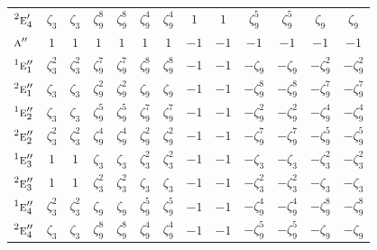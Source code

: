 \documentclass[10pt,a4paper]{article}
\numberwithin{equation}{section}
\newcommand{\irr}[1]{\text{\normalfont\scshape #1}}
\newcommand{\conjpair}[1]{{}^{#1}}
\newcommand{\rootunity}[1]{\zeta_{#1}}
\begin{document}
{\begin{longtable}{@{}lcccccccccccc@{}}
$\conjpair{2}\irr{e}_{4}'$ & $\rootunity{3}$ & $\rootunity{3}$ & $\rootunity{9}^{8}$ & $\rootunity{9}^{8}$ & $\rootunity{9}^{4}$ & $\rootunity{9}^{4}$ & $1$ & $1$ & $\rootunity{9}^{5}$ & $\rootunity{9}^{5}$ & $\rootunity{9}$ & $\rootunity{9}$\\
$\irr{a}''$ & $1$ & $1$ & $1$ & $1$ & $1$ & $1$ & $-1$ & $-1$ & $-1$ & $-1$ & $-1$ & $-1$\\
$\conjpair{1}\irr{e}_{1}''$ & $\rootunity{3}^{2}$ & $\rootunity{3}^{2}$ & $\rootunity{9}^{7}$ & $\rootunity{9}^{7}$ & $\rootunity{9}^{8}$ & $\rootunity{9}^{8}$ & $-1$ & $-1$ & $-\rootunity{9}$ & $-\rootunity{9}$ & $-\rootunity{9}^{2}$ & $-\rootunity{9}^{2}$\\
$\conjpair{2}\irr{e}_{1}''$ & $\rootunity{3}$ & $\rootunity{3}$ & $\rootunity{9}^{2}$ & $\rootunity{9}^{2}$ & $\rootunity{9}$ & $\rootunity{9}$ & $-1$ & $-1$ & $-\rootunity{9}^{8}$ & $-\rootunity{9}^{8}$ & $-\rootunity{9}^{7}$ & $-\rootunity{9}^{7}$\\
$\conjpair{1}\irr{e}_{2}''$ & $\rootunity{3}$ & $\rootunity{3}$ & $\rootunity{9}^{5}$ & $\rootunity{9}^{5}$ & $\rootunity{9}^{7}$ & $\rootunity{9}^{7}$ & $-1$ & $-1$ & $-\rootunity{9}^{2}$ & $-\rootunity{9}^{2}$ & $-\rootunity{9}^{4}$ & $-\rootunity{9}^{4}$\\
$\conjpair{2}\irr{e}_{2}''$ & $\rootunity{3}^{2}$ & $\rootunity{3}^{2}$ & $\rootunity{9}^{4}$ & $\rootunity{9}^{4}$ & $\rootunity{9}^{2}$ & $\rootunity{9}^{2}$ & $-1$ & $-1$ & $-\rootunity{9}^{7}$ & $-\rootunity{9}^{7}$ & $-\rootunity{9}^{5}$ & $-\rootunity{9}^{5}$\\
$\conjpair{1}\irr{e}_{3}''$ & $1$ & $1$ & $\rootunity{3}$ & $\rootunity{3}$ & $\rootunity{3}^{2}$ & $\rootunity{3}^{2}$ & $-1$ & $-1$ & $-\rootunity{3}$ & $-\rootunity{3}$ & $-\rootunity{3}^{2}$ & $-\rootunity{3}^{2}$\\
$\conjpair{2}\irr{e}_{3}''$ & $1$ & $1$ & $\rootunity{3}^{2}$ & $\rootunity{3}^{2}$ & $\rootunity{3}$ & $\rootunity{3}$ & $-1$ & $-1$ & $-\rootunity{3}^{2}$ & $-\rootunity{3}^{2}$ & $-\rootunity{3}$ & $-\rootunity{3}$\\
$\conjpair{1}\irr{e}_{4}''$ & $\rootunity{3}^{2}$ & $\rootunity{3}^{2}$ & $\rootunity{9}$ & $\rootunity{9}$ & $\rootunity{9}^{5}$ & $\rootunity{9}^{5}$ & $-1$ & $-1$ & $-\rootunity{9}^{4}$ & $-\rootunity{9}^{4}$ & $-\rootunity{9}^{8}$ & $-\rootunity{9}^{8}$\\
$\conjpair{2}\irr{e}_{4}''$ & $\rootunity{3}$ & $\rootunity{3}$ & $\rootunity{9}^{8}$ & $\rootunity{9}^{8}$ & $\rootunity{9}^{4}$ & $\rootunity{9}^{4}$ & $-1$ & $-1$ & $-\rootunity{9}^{5}$ & $-\rootunity{9}^{5}$ & $-\rootunity{9}$ & $-\rootunity{9}$\\

\end{longtable}}
\end{document}
